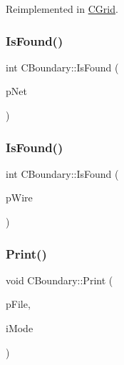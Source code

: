 Reimplemented in \mbox{\hyperlink{classCGrid_ac56d94ad7df38d3908ff3b12670d9812}{C\+Grid}}.

\mbox{\label{classCBoundary_ab3b3ba7d56c3881511ea7fc38461514e}} 
\subsubsection{\texorpdfstring{IsFound()}{IsFound()}\hspace{0.1cm}{\footnotesize\ttfamily [1/2]}}
{\footnotesize\ttfamily int C\+Boundary\+::\+Is\+Found (\begin{DoxyParamCaption}\item[{\mbox{\hyperlink{classCNet}{C\+Net}} $\ast$}]{p\+Net }\end{DoxyParamCaption})}

\mbox{\label{classCBoundary_a01471d1353c553f1c36d57e41b31fddd}} 
\subsubsection{\texorpdfstring{IsFound()}{IsFound()}\hspace{0.1cm}{\footnotesize\ttfamily [2/2]}}
{\footnotesize\ttfamily int C\+Boundary\+::\+Is\+Found (\begin{DoxyParamCaption}\item[{\mbox{\hyperlink{classCWire}{C\+Wire}} $\ast$}]{p\+Wire }\end{DoxyParamCaption})}

\mbox{\label{classCBoundary_a12a1e37297bd35f915544d02bd8c0cf1}} 
\subsubsection{\texorpdfstring{Print()}{Print()}}
{\footnotesize\ttfamily void C\+Boundary\+::\+Print (\begin{DoxyParamCaption}\item[{F\+I\+LE $\ast$}]{p\+File,  }\item[{int}]{i\+Mode }\end{DoxyParamCaption})\hspace{0.3cm}{\ttfamily [virtual]}}



